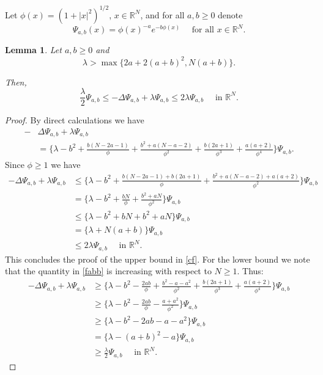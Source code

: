 \documentclass[leqno,12pt]{article}
\newcommand{\R}{\mathbb R}
\newtheorem{lemma}[theorem]{Lemma}
\numberwithin{equation}{section}
\begin{document}
Let $\phi(x)=(1+|x|^2)^{1/2}$, $x\in \R^N$, and for all $a, b\geq 0$ denote 
\begin{equation}\label{fab}
\Psi_{a,b}(x)=\phi(x)^{-a}e^{-b\phi(x)}\quad \mbox{ for all }x\in \R^N.
\end{equation} 

\begin{lemma}\label{calcule}
Let $a,b\geq 0$ and 
\begin{equation}\label{lam1}
\lambda>\max\{2a+2(a+b)^2, N(a+b)\}.
\end{equation}


Then,
\begin{equation}\label{cf}
\frac{\lambda}{2} \Psi_{a,b}\leq -\Delta \Psi_{a,b}+\lambda \Psi_{a,b}\leq 2\lambda \Psi_{a,b} \quad\mbox{ in }\R^N.
\end{equation}
\end{lemma}
\begin{proof} By direct calculations we have 
\begin{equation}\label{fabb}
\begin{aligned}
-&\Delta   \Psi_{a,b}+\lambda \Psi_{a,b}\\
&=\Big\{\lambda-b^2+\frac{b(N-2a-1)}{\phi}+\frac{b^2+a(N-a-2)}{\phi^2}+\frac{b(2a+1)}{\phi^3}+\frac{a(a+2)}{\phi^4}  \Big\}\Psi_{a,b}.
\end{aligned}
\end{equation}
Since $\phi\geq 1$ we have
$$
\begin{aligned}
-\Delta   \Psi_{a,b}+\lambda \Psi_{a,b} & \leq \Big\{\lambda-b^2+\frac{b(N-2a-1)+b(2a+1)}{\phi}+\frac{b^2+a(N-a-2)+a(a+2)}{\phi^2}  \Big\}\Psi_{a,b}\\
& =\Big\{\lambda-b^2+\frac{bN}{\phi}+\frac{b^2+aN}{\phi^2}  \Big\}\Psi_{a,b}\\
& \leq \Big\{\lambda-b^2+bN+b^2+aN \Big\}\Psi_{a,b}\\
& = \Big\{\lambda+N(a+b) \Big\}\Psi_{a,b}\\
& \leq 2\lambda\Psi_{a,b} \quad \mbox{ in }\R^N.
\end{aligned}
$$
This concludes the proof of the upper bound in \eqref{cf}. For the lower bound we  note that the quantity in \eqref{fabb} is increasing with respect to $N\geq 1$. Thus:
$$
\begin{aligned}
-\Delta   \Psi_{a,b}+\lambda \Psi_{a,b}& \geq \Big\{\lambda-b^2-\frac{2ab}{\phi}+\frac{b^2-a-a^2}{\phi^2}+\frac{b(2a+1)}{\phi^3}+\frac{a(a+2)}{\phi^4}  \Big\}\Psi_{a,b}\\
&\geq \Big\{\lambda-b^2-\frac{2ab}{\phi}-\frac{a+a^2}{\phi^2}\Big\}\Psi_{a,b}\\
&\geq \Big\{\lambda-b^2-2ab-a-a^2\Big\}\Psi_{a,b}\\
&= \Big\{\lambda-(a+b)^2-a \Big\}\Psi_{a,b}\\
&\geq \frac{\lambda}{2} \Psi_{a,b} \quad \mbox{ in }\R^N.
\end{aligned}
$$
\end{proof}
\end{document}
